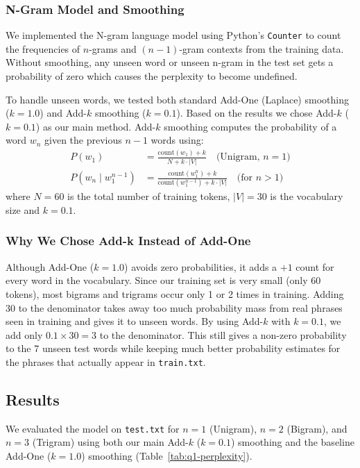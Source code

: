 \documentclass[sigconf]{acmart}
\begin{document}
\subsubsection{N-Gram Model and Smoothing}
We implemented the N-gram language model using Python's \texttt{Counter} to count the frequencies of $n$-grams and $(n-1)$-gram contexts from the training data. Without smoothing, any unseen word or unseen n-gram in the test set gets a probability of zero which causes the perplexity to become undefined.

To handle unseen words, we tested both standard Add-One (Laplace) smoothing ($k = 1.0$) and Add-$k$ smoothing ($k = 0.1$). Based on the results we chose Add-$k$ ($k = 0.1$) as our main method. Add-$k$ smoothing computes the probability of a word $w_n$ given the previous $n-1$ words using:
\begin{align}
P(w_1) &= \frac{\text{count}(w_1) + k}{N + k \cdot |V|} \quad \text{(Unigram, } n = 1\text{)} \\
P(w_n \mid w_1^{n-1}) &= \frac{\text{count}(w_1^{n}) + k}{\text{count}(w_1^{n-1}) + k \cdot |V|} \quad \text{(for } n > 1\text{)}
\end{align}
where $N = 60$ is the total number of training tokens, $|V| = 30$ is the vocabulary size and $k = 0.1$.

\subsubsection{Why We Chose Add-k Instead of Add-One}
Although Add-One ($k = 1.0$) avoids zero probabilities, it adds a $+1$ count for every word in the vocabulary. Since our training set is very small (only 60 tokens), most bigrams and trigrams occur only 1 or 2 times in training. Adding 30 to the denominator takes away too much probability mass from real phrases seen in training and gives it to unseen words. By using Add-$k$ with $k = 0.1$, we add only $0.1 \times 30 = 3$ to the denominator. This still gives a non-zero probability to the 7 unseen test words while keeping much better probability estimates for the phrases that actually appear in \texttt{train.txt}.

\subsection{Results}
We evaluated the model on \texttt{test.txt} for $n = 1$ (Unigram), $n = 2$ (Bigram), and $n = 3$ (Trigram) using both our main Add-$k$ ($k = 0.1$) smoothing and the baseline Add-One ($k = 1.0$) smoothing (Table~\ref{tab:q1-perplexity}).
\end{document}
